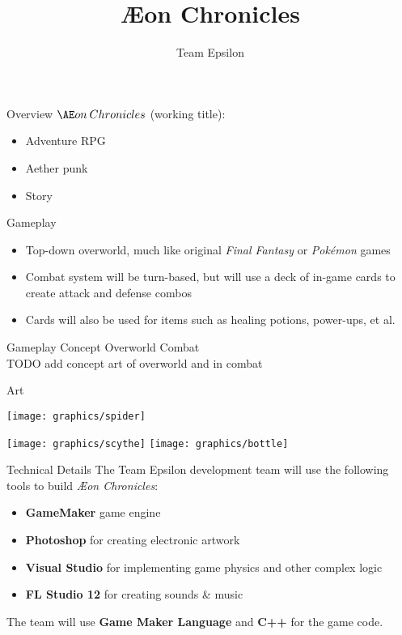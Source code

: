 \documentclass{teamepsilon}
\title{{\AE}on Chronicles}
\author{Team Epsilon}
\institute{Colorado School of Mines}
\begin{document}
\begin{frame}{Overview}
    $\AE on\:Chronicles$ (working title):
    \begin{itemize}
        \item Adventure RPG
        \item Aether punk
        \item Story
    \end{itemize}
\end{frame}

\begin{frame}{Gameplay}
    \begin{itemize}
        \item Top-down overworld, much like original \textit{Final Fantasy}
            or \textit{Pok\'emon} games
        \item Combat system will be turn-based, but will use a deck of in-game
            cards to create attack and defense combos
        \item Cards will also be used for items such as healing potions,
            power-ups, et al.
    \end{itemize}
\end{frame}

\begin{frame}{Gameplay Concept}
    Overworld \hfill Combat \\
    TODO add concept art of overworld and in combat
\end{frame}

\begin{frame}{Art}

    \vspace{0.5em}
    \begin{minipage}{0.65\textwidth}
        \texttt{[image: graphics/spider]}
    \end{minipage}%
    \begin{minipage}{0.35\textwidth-1em}
        \texttt{[image: graphics/scythe]}
        \vspace{4mm}
        \texttt{[image: graphics/bottle]}
    \end{minipage}

\end{frame}

\begin{frame}{Technical Details}
    The Team Epsilon development team will use the following tools to build
    \textit{{\AE}on Chronicles}:

    \begin{itemize}
        \item \textbf{GameMaker} game engine
        \item \textbf{Photoshop} for creating electronic artwork
        \item \textbf{Visual Studio} for implementing game physics and other
            complex logic
        \item \textbf{FL Studio 12} for creating sounds \& music
    \end{itemize}

    The team will use \textbf{Game Maker Language} and \textbf{C++} for the game
    code.
\end{frame}
\end{document}

